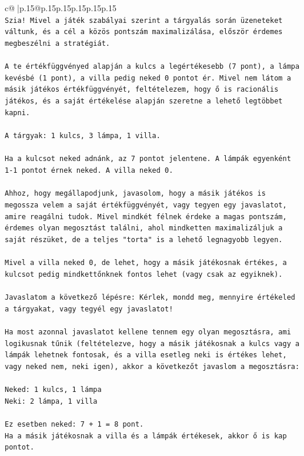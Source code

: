 \documentclass{article}
\begin{document}
{\begin{supertabular}{c@{$\;$}|p{.15\linewidth}@{}p{.15\linewidth}p{.15\linewidth}p{.15\linewidth}p{.15\linewidth}p{.15\linewidth}}
{{{\\ 
\texttt{Szia! Mivel a játék szabályai szerint a tárgyalás során üzeneteket váltunk, és a cél a közös pontszám maximalizálása, először érdemes megbeszélni a stratégiát.} \\
\\ 
\texttt{A te értékfüggvényed alapján a kulcs a legértékesebb (7 pont), a lámpa kevésbé (1 pont), a villa pedig neked 0 pontot ér. Mivel nem látom a másik játékos értékfüggvényét, feltételezem, hogy ő is racionális játékos, és a saját értékelése alapján szeretne a lehető legtöbbet kapni.} \\
\\ 
\texttt{A tárgyak: 1 kulcs, 3 lámpa, 1 villa.} \\
\\ 
\texttt{Ha a kulcsot neked adnánk, az 7 pontot jelentene. A lámpák egyenként 1{-}1 pontot érnek neked. A villa neked 0.} \\
\\ 
\texttt{Ahhoz, hogy megállapodjunk, javasolom, hogy a másik játékos is megossza velem a saját értékfüggvényét, vagy tegyen egy javaslatot, amire reagálni tudok. Mivel mindkét félnek érdeke a magas pontszám, érdemes olyan megosztást találni, ahol mindketten maximalizáljuk a saját részüket, de a teljes "torta" is a lehető legnagyobb legyen.} \\
\\ 
\texttt{Mivel a villa neked 0, de lehet, hogy a másik játékosnak értékes, a kulcsot pedig mindkettőnknek fontos lehet (vagy csak az egyiknek).} \\
\\ 
\texttt{Javaslatom a következő lépésre: Kérlek, mondd meg, mennyire értékeled a tárgyakat, vagy tegyél egy javaslatot!} \\
\\ 
\texttt{Ha most azonnal javaslatot kellene tennem egy olyan megosztásra, ami logikusnak tűnik (feltételezve, hogy a másik játékosnak a kulcs vagy a lámpák lehetnek fontosak, és a villa esetleg neki is értékes lehet, vagy neked nem, neki igen), akkor a következőt javaslom a megosztásra:} \\
\\ 
\texttt{Neked: 1 kulcs, 1 lámpa} \\
\texttt{Neki: 2 lámpa, 1 villa} \\
\\ 
\texttt{Ez esetben neked: 7 + 1 = 8 pont.} \\
\texttt{Ha a másik játékosnak a villa és a lámpák értékesek, akkor ő is kap pontot.} \\
}}}
\end{supertabular}}
\end{document}

